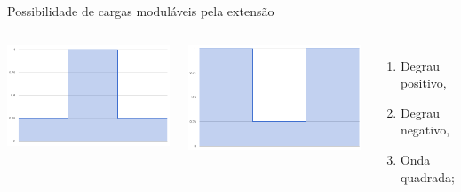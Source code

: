 \begin{frame}{Possibilidade de cargas moduláveis pela extensão}
	\begin{columns}
		\begin{minipage}[c][0.4\textheight][c]{\linewidth}
			\centering
			\includegraphics[width=0.8\linewidth]{../monograph/images/carga-sintetica1.png}
			\label{fig:degrau-positivo}
		\end{minipage}
		\begin{minipage}[c][0.4\textheight][c]{\linewidth}
			\centering
			\includegraphics[width=0.8\linewidth]{../monograph/images/carga-sintetica2.png}
			\label{fig:degrau-negativo}
		\end{minipage}
		\begin{minipage}[c][0.4\textheight][c]{\linewidth}
			\begin{enumerate}
				\item Degrau positivo,
				\item Degrau negativo,
				\item Onda quadrada;
			\end{enumerate}
		\end{minipage}
		\begin{minipage}[c][0.4\textheight][c]{\linewidth}

\end{minipage}
\end{columns}
\end{frame}
